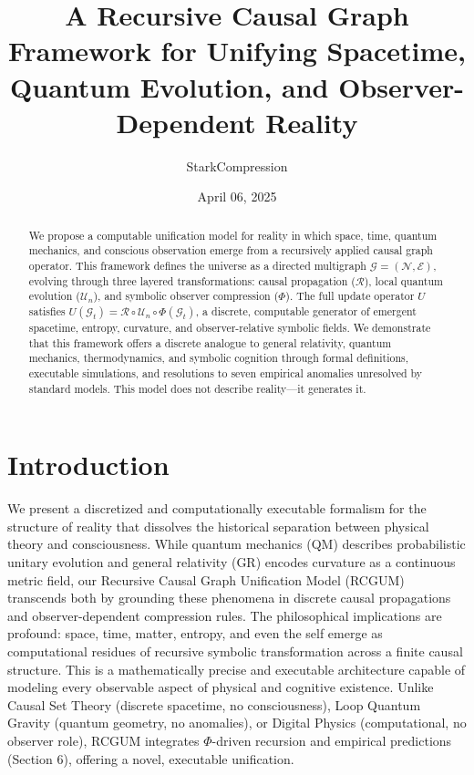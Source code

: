 \documentclass[11pt]{article}
\title{A Recursive Causal Graph Framework for Unifying Spacetime, Quantum Evolution, and Observer-Dependent Reality}
\author{StarkCompression}
\date{April 06, 2025}
\begin{document}
\maketitle

\begin{abstract}
We propose a computable unification model for reality in which space, time, quantum mechanics, and conscious observation emerge from a recursively applied causal graph operator. This framework defines the universe as a directed multigraph \( \mathcal{G} = (\mathcal{N}, \mathcal{E}) \), evolving through three layered transformations: causal propagation (\( \mathcal{R} \)), local quantum evolution (\( \mathcal{U}_n \)), and symbolic observer compression (\( \Phi \)). The full update operator \( U \) satisfies \( U(\mathcal{G}_t) = \mathcal{R} \circ \mathcal{U}_n \circ \Phi(\mathcal{G}_t) \), a discrete, computable generator of emergent spacetime, entropy, curvature, and observer-relative symbolic fields. We demonstrate that this framework offers a discrete analogue to general relativity, quantum mechanics, thermodynamics, and symbolic cognition through formal definitions, executable simulations, and resolutions to seven empirical anomalies unresolved by standard models. This model does not describe reality—it generates it.
\end{abstract}

\section{Introduction}
We present a discretized and computationally executable formalism for the structure of reality that dissolves the historical separation between physical theory and consciousness. While quantum mechanics (QM) describes probabilistic unitary evolution and general relativity (GR) encodes curvature as a continuous metric field, our Recursive Causal Graph Unification Model (RCGUM) transcends both by grounding these phenomena in discrete causal propagations and observer-dependent compression rules. The philosophical implications are profound: space, time, matter, entropy, and even the self emerge as computational residues of recursive symbolic transformation across a finite causal structure. This is a mathematically precise and executable architecture capable of modeling every observable aspect of physical and cognitive existence. Unlike Causal Set Theory (discrete spacetime, no consciousness), Loop Quantum Gravity (quantum geometry, no anomalies), or Digital Physics (computational, no observer role), RCGUM integrates \( \Phi \)-driven recursion and empirical predictions (Section 6), offering a novel, executable unification.
\end{document}

